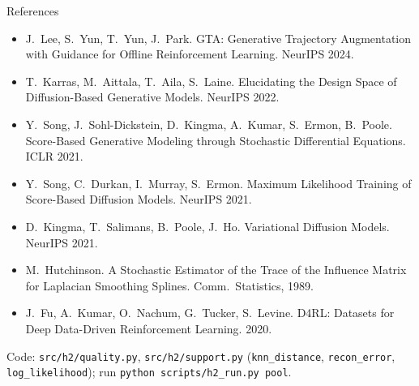 \documentclass[aspectratio=169,11pt]{beamer}
\begin{document}
\begin{frame}{References}
\footnotesize
\begin{itemize}
\item J.\ Lee, S.\ Yun, T.\ Yun, J.\ Park. GTA: Generative Trajectory Augmentation with Guidance for Offline Reinforcement Learning. NeurIPS 2024.
\item T.\ Karras, M.\ Aittala, T.\ Aila, S.\ Laine. Elucidating the Design Space of Diffusion-Based Generative Models. NeurIPS 2022.
\item Y.\ Song, J.\ Sohl-Dickstein, D.\ Kingma, A.\ Kumar, S.\ Ermon, B.\ Poole. Score-Based Generative Modeling through Stochastic Differential Equations. ICLR 2021.
\item Y.\ Song, C.\ Durkan, I.\ Murray, S.\ Ermon. Maximum Likelihood Training of Score-Based Diffusion Models. NeurIPS 2021.
\item D.\ Kingma, T.\ Salimans, B.\ Poole, J.\ Ho. Variational Diffusion Models. NeurIPS 2021.
\item M.\ Hutchinson. A Stochastic Estimator of the Trace of the Influence Matrix for Laplacian Smoothing Splines. Comm.\ Statistics, 1989.
\item J.\ Fu, A.\ Kumar, O.\ Nachum, G.\ Tucker, S.\ Levine. D4RL: Datasets for Deep Data-Driven Reinforcement Learning. 2020.
\end{itemize}
\vspace{0.5em}
\small Code: \texttt{src/h2/quality.py}, \texttt{src/h2/support.py} (\texttt{knn\_distance}, \texttt{recon\_error}, \texttt{log\_likelihood}); run \texttt{python scripts/h2\_run.py pool}.
\end{frame}
\end{document}
